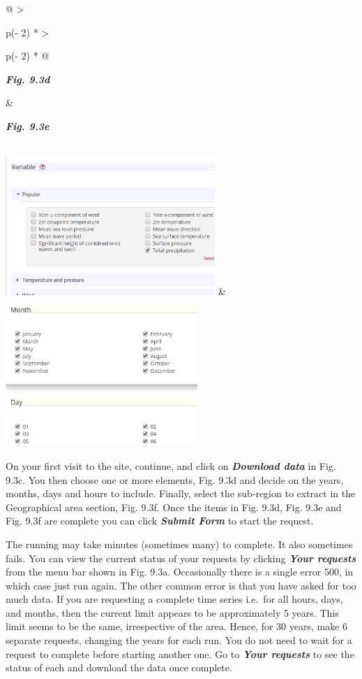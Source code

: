 \documentclass[
  letterpaper,
  DIV=11,
  numbers=noendperiod]{scrreprt}
\begin{document}
\begin{longtable}[]{@{}
  >{\raggedright\arraybackslash}p{(\columnwidth - 2\tabcolsep) * }
  >{\raggedright\arraybackslash}p{(\columnwidth - 2\tabcolsep) * }@{}}
\toprule\noalign{}
\begin{minipage}[b]{\linewidth}\raggedright
\textbf{\emph{Fig. 9.3d}}
\end{minipage} & \begin{minipage}[b]{\linewidth}\raggedright
\textbf{\emph{Fig. 9.3e}}
\end{minipage} \\
\midrule\noalign{}
\endhead
\bottomrule\noalign{}
\endlastfoot
\includegraphics[width=3.12868in,height=2.06121in]{figures/Fig9.3d.png}
&
\includegraphics[width=2.86626in,height=2.20566in]{figures/Fig9.3e.png} \\
\end{longtable}

On your first visit to the site, continue, and click on
\textbf{\emph{Download data}} in Fig. 9.3c. You then choose one or more
elements, Fig. 9.3d and decide on the years, months, days and hours to
include. Finally, select the sub-region to extract in the Geographical
area section, Fig. 9.3f. Once the items in Fig. 9.3d, Fig. 9.3e and Fig.
9.3f are complete you can click \textbf{\emph{Submit Form}} to start the
request.

The running may take minutes (sometimes many) to complete. It also
sometimes fails. You can view the current status of your requests by
clicking \textbf{\emph{Your requests}} from the menu bar shown in Fig.
9.3a. Occasionally there is a single error 500, in which case just run
again. The other common error is that you have asked for too much data.
If you are requesting a complete time series i.e.~for all hours, days,
and months, then the current limit appears to be approximately 5 years.
This limit seems to be the same, irrespective of the area. Hence, for 30
years, make 6 separate requests, changing the years for each run. You do
not need to wait for a request to complete before starting another one.
Go to \textbf{\emph{Your requests}} to see the status of each and
download the data once complete.
\end{document}
